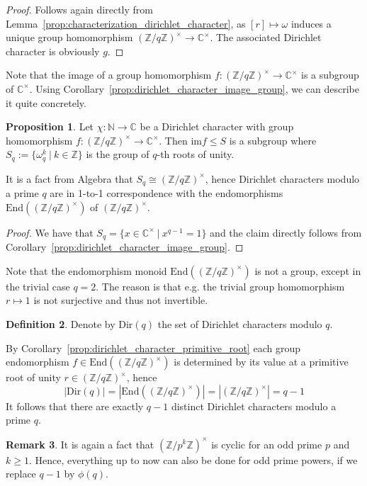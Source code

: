\documentclass{scrartcl}
\newcommand{\N}{\mathbb{N}}
\newcommand{\Z}{\mathbb{Z}}
\newcommand{\C}{\mathbb{C}}
\newcommand{\units}{\times}
\theoremstyle{definition}
\newtheorem{definition}{Definition}
\newtheorem{remark}[definition]{Remark}
\newtheorem{proposition}[definition]{Proposition}
\begin{document}
\begin{proof}
    Follows again directly from Lemma~\ref{prop:characterization_dirichlet_character}, as $[r] \mapsto \omega$ induces a unique group homomorphism $(\Z/q\Z)^\units \to \C^\units$.
    The associated Dirichlet character is obviously $g$.
\end{proof}
Note that the image of a group homomorphism $f: (\Z/q\Z)^\units \to \C^\units$ is a subgroup of $\C^\units$.
Using Corollary~\ref{prop:dirichlet_character_image_group}, we can describe it quite concretely.
\begin{proposition}
    Let $\chi: \N \to \C$ be a Dirichlet character with group homomorphism $f: (\Z/q\Z)^\units \to \C^\units$.
    Then $\mathrm{im}f \leq S$ is a subgroup where $S_q := \{ \omega_q^k \ | \ k \in \Z \}$ is the group of $q$-th roots of unity.
    
    It is a fact from Algebra that $S_q \cong (\Z/q\Z)^\units$, hence Dirichlet characters modulo a prime $q$ are in 1-to-1 correspondence with the endomorphisms $\mathrm{End}((\Z/q\Z)^\units)$ of $(\Z/q\Z)^\units$.
\end{proposition}
\begin{proof}
    We have that $S_q = \{ x \in \C^\units \ | \ x^{q - 1} = 1 \}$ and the claim directly follows from Corollary~\ref{prop:dirichlet_character_image_group}.
\end{proof}
Note that the endomorphism monoid $\mathrm{End}((\Z/q\Z)^\units)$ is not a group, except in the trivial case $q = 2$.
The reason is that e.g. the trivial group homomorphism $r \mapsto 1$ is not surjective and thus not invertible.
\begin{definition}
    Denote by $\mathrm{Dir}(q)$ the set of Dirichlet characters modulo $q$.
\end{definition}
By Corollary~\ref{prop:dirichlet_character_primitive_root} each group endomorphism $f \in \mathrm{End}((\Z/q\Z)^\units)$ is determined by its value at a primitive root of unity $r \in (\Z/q\Z)^\units$, hence
\begin{equation*}
    |\mathrm{Dir}(q)| = |\mathrm{End}((\Z/q\Z)^\units)| = |(\Z/q\Z)^\units| = q - 1
\end{equation*}
It follows that there are exactly $q - 1$ distinct Dirichlet characters modulo a prime $q$.
\begin{remark}
    It is again a fact that $(\Z/p^k\Z)^\units$ is cyclic for an odd prime $p$ and $k \geq 1$.
    Hence, everything up to now can also be done for odd prime powers, if we replace $q - 1$ by $\phi(q)$.
\end{remark}
\end{document}
